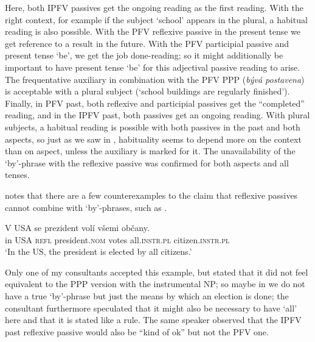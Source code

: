 \documentclass[output=paper,colorlinks,citecolor=brown]{langscibook}
\begin{document}
\noindent Here, both IPFV passives get the ongoing reading as the first reading. With the right context, for example if the subject `school' appears in the plural, a habitual reading is also possible. With the PFV reflexive passive in the present tense we get reference to a result in the future. With the PFV participial passive and present tense `be', we get the job done-reading; so it might additionally be important to have present tense `be' for this adjectival passive reading to arise. The frequentative auxiliary in combination with the PFV PPP (\textit{bývá postavena}) is acceptable with a plural subject (`school buildings are regularly finished'). Finally, in PFV past, both reflexive and participial passives get the ``completed'' reading, and in the IPFV past, both passives get an ongoing reading. With plural subjects, a habitual reading is possible with both passives in the past and both aspects, so just as we saw in , habituality seems to depend more on the context than on aspect, unless the auxiliary is marked for it. The unavailability of the `by'-phrase with the reflexive passive was confirmed for both aspects and all tenses. 
	
\citet{karlik17} notes that there are a few counterexamples to the claim that reflexive passives cannot combine with `by'-phrases, such as . %

\ea\label{ex:reflbyok}
\gll V USA se prezident volí všemi občany.\\
	in USA \textsc{refl} president.\textsc{nom} votes all.\textsc{instr.pl} citizen.\textsc{instr.pl}\\
\glt	`In the US, the president is elected by all citizens.'
\z 

\noindent Only one of my consultants accepted this example, but stated that it did not feel equivalent to the PPP version with the instrumental NP; so maybe in  we do not have a true `by'-phrase but just the means by which an election is done; the consultant furthermore speculated that it might also be necessary to have `all' here and that it is stated like a rule. The same speaker observed that the IPFV past reflexive passive would also be ``kind of ok'' but not the PFV one. %
\end{document}
